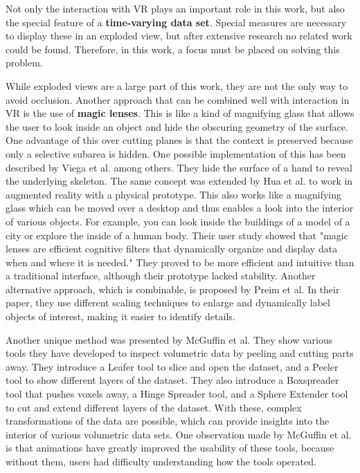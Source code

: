 Not only the interaction with VR plays an important role in this work, but also the special feature of a \textbf{time-varying data set}. 
Special measures are necessary to display these in an exploded view, but after extensive research no related work could be found. 
Therefore, in this work, a focus must be placed on solving this problem.

While exploded views are a large part of this work, they are not the only way to avoid occlusion. 
Another approach that can be combined well with interaction in VR is the use of \textbf{magic lenses}.
This is like a kind of magnifying glass that allows the user to look inside an object and hide the obscuring geometry of the surface.
One advantage of this over cutting planes is that the context is preserved because only a selective subarea is hidden.   
One possible implementation of this has been described by Viega et al. among others.\cite{Viega_1996}
They hide the surface of a hand to reveal the underlying skeleton. %
The same concept was extended by Hua et al. to work in augmented reality with a physical prototype.\cite{Hua_2006}
This also works like a magnifying glass which can be moved over a desktop and thus enables a look into the interior of various objects. 
For example, you can look inside the buildings of a model of a city or explore the inside of a human body.
Their user study showed that "magic lenses are efficient cognitive filters that dynamically organize and display data when and where it is needed."\cite{Hua_2006}
They proved to be more efficient and intuitive than a traditional interface, although their prototype lacked stability.
Another alternative approach, which is combinable, is proposed by Preim et al. In their paper, they use different scaling techniques to enlarge and dynamically label objects of interest, making it easier to identify details.\cite{Preim_1997}

Another unique method was presented by McGuffin et al.\cite{McGuffin}
They show various tools they have developed to inspect volumetric data by peeling and cutting parts away.
They introduce a Leafer tool to slice and open the dataset, and a Peeler tool to show different layers of the dataset. They also introduce a Boxspreader tool that pushes voxels away, a Hinge Spreader tool, and a Sphere Extender tool to cut and extend different layers of the dataset.
With these, complex transformations of the data are possible, which can provide insights into the interior of various volumetric data sets.
One observation made by McGuffin et al. is that animations have greatly improved the usability of these tools, because without them, users had difficulty understanding how the tools operated. 

